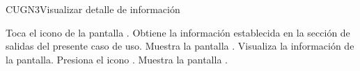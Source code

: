 \begin{UseCase}{CUGN3}{Visualizar detalle de información}

\end{UseCase}


 \begin{UCtrayectoria}
    \UCpaso[\UCactor]  Toca el icono \btnDetalles de la pantalla .
  	\UCpaso[\UCsist]Obtiene la información establecida en la sección de salidas del presente caso de uso.
    \UCpaso[\UCsist] Muestra la pantalla  .
    \UCpaso[\UCactor] Visualiza la información de la pantalla. 
    \UCpaso[\UCactor] Presiona el icono \btnRegresar. 
	\UCpaso[\UCsist]  Muestra la pantalla .
 \end{UCtrayectoria}